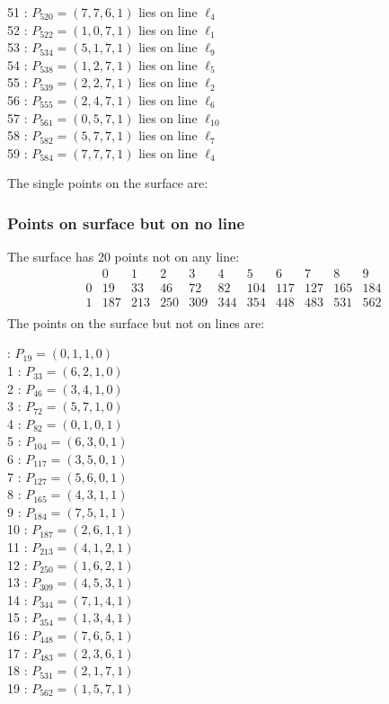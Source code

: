 \documentclass{article}
\begin{document}
{\begin{multicols}{2}
51 : $P_{520}=( 7, 7, 6, 1 )$ lies on line $\ell_{4}$\\
52 : $P_{522}=( 1, 0, 7, 1 )$ lies on line $\ell_{1}$\\
53 : $P_{534}=( 5, 1, 7, 1 )$ lies on line $\ell_{9}$\\
54 : $P_{538}=( 1, 2, 7, 1 )$ lies on line $\ell_{5}$\\
55 : $P_{539}=( 2, 2, 7, 1 )$ lies on line $\ell_{2}$\\
56 : $P_{555}=( 2, 4, 7, 1 )$ lies on line $\ell_{6}$\\
57 : $P_{561}=( 0, 5, 7, 1 )$ lies on line $\ell_{10}$\\
58 : $P_{582}=( 5, 7, 7, 1 )$ lies on line $\ell_{7}$\\
59 : $P_{584}=( 7, 7, 7, 1 )$ lies on line $\ell_{4}$\\
\end{multicols}
The single points on the surface are:\\
\subsubsection*{Points on surface but on no line}
The surface has 20 points not on any line:\\
$$
\begin{array}{r|*{10}{r}}
 & 0 & 1 & 2 & 3 & 4 & 5 & 6 & 7 & 8 & 9\\
\hline
0 & 19 & 33 & 46 & 72 & 82 & 104 & 117 & 127 & 165 & 184\\
1 & 187 & 213 & 250 & 309 & 344 & 354 & 448 & 483 & 531 & 562\\
\end{array}
$$
The points on the surface but not on lines are:\\
\begin{multicols}{2}
 : $P_{19}=( 0, 1, 1, 0 )$\\
1 : $P_{33}=( 6, 2, 1, 0 )$\\
2 : $P_{46}=( 3, 4, 1, 0 )$\\
3 : $P_{72}=( 5, 7, 1, 0 )$\\
4 : $P_{82}=( 0, 1, 0, 1 )$\\
5 : $P_{104}=( 6, 3, 0, 1 )$\\
6 : $P_{117}=( 3, 5, 0, 1 )$\\
7 : $P_{127}=( 5, 6, 0, 1 )$\\
8 : $P_{165}=( 4, 3, 1, 1 )$\\
9 : $P_{184}=( 7, 5, 1, 1 )$\\
10 : $P_{187}=( 2, 6, 1, 1 )$\\
11 : $P_{213}=( 4, 1, 2, 1 )$\\
12 : $P_{250}=( 1, 6, 2, 1 )$\\
13 : $P_{309}=( 4, 5, 3, 1 )$\\
14 : $P_{344}=( 7, 1, 4, 1 )$\\
15 : $P_{354}=( 1, 3, 4, 1 )$\\
16 : $P_{448}=( 7, 6, 5, 1 )$\\
17 : $P_{483}=( 2, 3, 6, 1 )$\\
18 : $P_{531}=( 2, 1, 7, 1 )$\\
19 : $P_{562}=( 1, 5, 7, 1 )$\\
\end{multicols}
}
\end{document}
